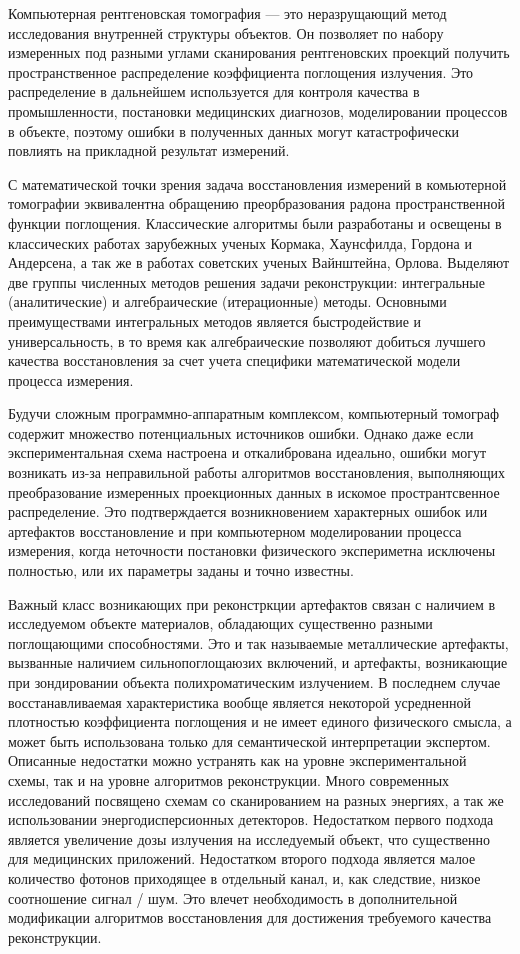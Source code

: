 {\actualityandprogress}

Компьютерная рентгеновская томография --- это неразрущающий метод исследования внутренней структуры объектов.
Он позволяет по набору измеренных под разными углами сканирования рентгеновских проекций получить пространственное распределение коэффициента поглощения излучения.
Это распределение в дальнейшем используется для контроля качества в промышленности, постановки медицинских диагнозов, моделировании процессов в объекте, поэтому ошибки в полученных данных могут катастрофически повлиять на прикладной результат измерений.

С математической точки зрения задача восстановления измерений в комьютерной томографии эквивалентна обращению преорбразования радона пространственной функции поглощения. 
Классические алгоритмы были разработаны и освещены в классических работах зарубежных ученых Кормака, Хаунсфилда, Гордона и Андерсена, а так же в работах советских ученых Вайнштейна, Орлова.
Выделяют две группы численных методов решения задачи реконструкции: интегральные (аналитические) и алгебраические (итерационные) методы.
Основными преимуществами интегральных методов является быстродействие и универсальность, в то время как алгебраические позволяют добиться лучшего качества восстановления за счет учета специфики математической модели процесса измерения.

Будучи сложным программно-аппаратным комплексом, компьютерный томограф содержит множество потенциальных источников ошибки.
Однако даже если экспериментальная схема настроена и откалибрована идеально, ошибки могут возникать из-за неправильной работы алгоритмов восстановления, выполняющих преобразование измеренных проекционных данных в искомое пространтсвенное распределение.
Это подтверждается возникновением характерных ошибок или артефактов восстановление и при компьютерном моделировании процесса измерения, когда неточности постановки физического экспериметна исключены полностью, или их параметры заданы и точно известны.

Важный класс возникающих при реконстркции артефактов связан с наличием в исследуемом объекте материалов, обладающих существенно разными поглощающими способностями.
Это и так называемые металлические артефакты, вызванные наличием сильнопоглощаюзих включений, и артефакты, возникающие при зондировании объекта полихроматическим излучением.
В последнем случае восстанавливаемая характеристика вообще является некоторой усредненной плотностью коэффициента поглощения и не имеет единого физического смысла, а может быть использована только для семантической интерпретации экспертом.
Описанные недостатки можно устранять как на уровне экспериментальной схемы, так и на уровне алгоритмов реконструкции.
Много современных исследований посвящено схемам со сканированием на разных энергиях, а так же использовании энергодисперсионных детекторов.
Недостатком первого подхода является увеличение дозы излучения на исследуемый объект, что существенно для медицинских приложений.
Недостатком второго подхода является малое количество фотонов приходящее в отдельный канал, и, как следствие, низкое соотношение сигнал / шум. 
Это влечет необходимость в дополнительной модификации алгоритмов восстановления для достижения требуемого качества реконструкции.

